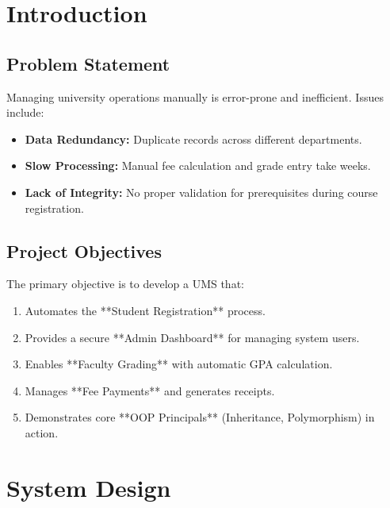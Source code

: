 \documentclass[12pt, a4paper]{report}
\begin{document}
\tableofcontents
\listoffigures
\listoftables

\newpage
{}

\chapter{Introduction}

\section{Problem Statement}
Managing university operations manually is error-prone and inefficient. Issues include:
\begin{itemize}
    \item \textbf{Data Redundancy:} Duplicate records across different departments.
    \item \textbf{Slow Processing:} Manual fee calculation and grade entry take weeks.
    \item \textbf{Lack of Integrity:} No proper validation for prerequisites during course registration.
\end{itemize}

\section{Project Objectives}
The primary objective is to develop a UMS that:
\begin{enumerate}
    \item Automates the **Student Registration** process.
    \item Provides a secure **Admin Dashboard** for managing system users.
    \item Enables **Faculty Grading** with automatic GPA calculation.
    \item Manages **Fee Payments** and generates receipts.
    \item Demonstrates core **OOP Principals** (Inheritance, Polymorphism) in action.
\end{enumerate}

\chapter{System Design}
\end{document}
